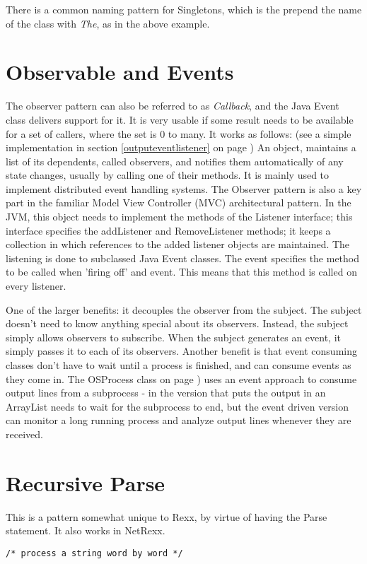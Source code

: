 {There is a common naming pattern for Singletons, which is the prepend
the name of the class with \emph{The}, as in the above example.
\section{Observable and Events}\label{events}
The observer pattern can also be referred to as \emph{Callback}, and
the Java Event class delivers support for it. It is very usable if
some result needs to be available for a set of callers, where the set
is 0 to many. It works as follows: (see a simple implementation in
section \ref{outputeventlistener} on page
\pageref{outputeventlistener})
An object, maintains a list of its dependents, called observers, and
notifies them automatically of any state changes, usually by calling
one of their methods. It is mainly used to implement distributed event
handling systems. The Observer pattern is also a key part in the
familiar Model View Controller (MVC) architectural pattern. In the
JVM, this object needs to implement the methods of the Listener
interface; this interface specifies the addListener and RemoveListener
methods; it keeps a collection in which references to the added
listener objects are maintained. The listening is done to subclassed
Java Event classes. The event specifies the method to be called when
'firing off' and event. This means that this method is called on every
listener.

One of the larger benefits: it decouples the observer from the
subject. The subject doesn't need to know anything special about its
observers. Instead, the subject simply allows observers to
subscribe. When the subject generates an event, it simply passes it to
each of its observers. Another benefit is that event consuming classes
don't have to wait until a process is finished, and can consume events
as they come in. The OSProcess class on page
\pageref{outputeventlistener}) uses an event approach to consume
output lines from a subprocess - in the version that puts the output
in an ArrayList needs to wait for the subprocess to end, but the event
driven version can monitor a long running process and analyze output
lines whenever they are received.

\section{Recursive Parse}
This is a pattern somewhat unique to Rexx, by virtue of \Rexx{} having the Parse
statement. It also works in NetRexx.
\begin{lstlisting}
/* process a string word by word */


\end{lstlisting}}
